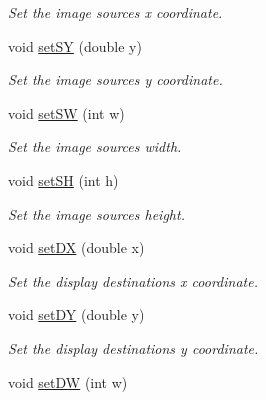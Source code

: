 \begin{DoxyCompactItemize}
\begin{DoxyCompactList}\small\item\em Set the image sources x coordinate. \end{DoxyCompactList}\item 
void \hyperlink{classObject_a48c2da85369813e9bf1eb71eee579e8f}{set\+SY} (double y)\hypertarget{classObject_a48c2da85369813e9bf1eb71eee579e8f}{}\label{classObject_a48c2da85369813e9bf1eb71eee579e8f}

\begin{DoxyCompactList}\small\item\em Set the image sources y coordinate. \end{DoxyCompactList}\item 
void \hyperlink{classObject_a90577eaa8ea00ed7d01bf6829719322b}{set\+SW} (int w)\hypertarget{classObject_a90577eaa8ea00ed7d01bf6829719322b}{}\label{classObject_a90577eaa8ea00ed7d01bf6829719322b}

\begin{DoxyCompactList}\small\item\em Set the image sources width. \end{DoxyCompactList}\item 
void \hyperlink{classObject_a91800313b280d6812e2b374608172d7f}{set\+SH} (int h)\hypertarget{classObject_a91800313b280d6812e2b374608172d7f}{}\label{classObject_a91800313b280d6812e2b374608172d7f}

\begin{DoxyCompactList}\small\item\em Set the image sources height. \end{DoxyCompactList}\item 
void \hyperlink{classObject_a7c068c88758bf95a147b123ce52026a0}{set\+DX} (double x)\hypertarget{classObject_a7c068c88758bf95a147b123ce52026a0}{}\label{classObject_a7c068c88758bf95a147b123ce52026a0}

\begin{DoxyCompactList}\small\item\em Set the display destinations x coordinate. \end{DoxyCompactList}\item 
void \hyperlink{classObject_a9e7d9c484f3cdeac79edf6b1b13942d0}{set\+DY} (double y)\hypertarget{classObject_a9e7d9c484f3cdeac79edf6b1b13942d0}{}\label{classObject_a9e7d9c484f3cdeac79edf6b1b13942d0}

\begin{DoxyCompactList}\small\item\em Set the display destinations y coordinate. \end{DoxyCompactList}\item 
void \hyperlink{classObject_a7c9fcca4e1bab0097443557d02eaa498}{set\+DW} (int w)\hypertarget{classObject_a7c9fcca4e1bab0097443557d02eaa498}{}\label{classObject_a7c9fcca4e1bab0097443557d02eaa498}


\end{DoxyCompactItemize}
